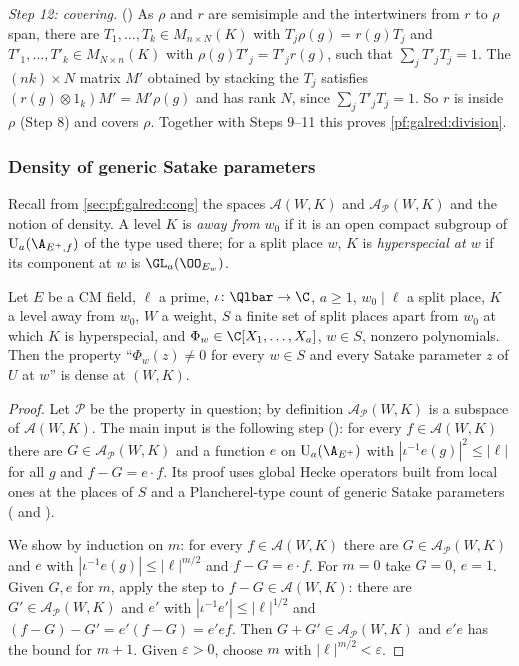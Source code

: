 \emph{Step 12: covering.} () As $\rho$ and $r$ are
semisimple and the intertwiners from $r$ to $\rho$ span, there are $T_1,\dots,T_k\in M_{n\times N}(K)$ with
$T_j\rho(g)=r(g)T_j$ and $T'_1,\dots,T'_k\in M_{N\times n}(K)$ with $\rho(g)T'_j=T'_jr(g)$, such that $\sum_jT'_jT_j=1$. The
$(nk)\times N$ matrix $M'$ obtained by stacking the $T_j$ satisfies $(r(g)\otimes1_k)M'=M'\rho(g)$ and has rank $N$, since
$\sum_jT'_jT_j=1$. So $r$ is inside $\rho$ (Step 8) and covers $\rho$. Together with Steps 9--11 this proves
\cref{pf:galred:division}.

\subsubsection{Density of generic Satake parameters}

Recall from \cref{sec:pf:galred:cong} the spaces $\mathcal A(W,K)$ and $\mathcal A_{\mathcal P}(W,K)$ and the notion of
density. A level $K$ is \emph{away from} $w_0$ if it is an open compact subgroup of $\galredU_a(\A_{E^+,f})$ of the type
used there; for a split place $w$, $K$ is \emph{hyperspecial at $w$} if its component at $w$ is $\GL_a(\OO_{E_w})$.

\begin{theorem}\label{pf:galred:densegen}
Let $E$ be a CM field, $\ell$ a prime, $\iota\colon\Qlbar\to\C$, $a\ge1$, $w_0\mid\ell$ a split place, $K$ a level away
from $w_0$, $W$ a weight, $S$ a finite set of split places apart from $w_0$ at which $K$ is hyperspecial, and $\Phi_w\in
\C[X_1,\dots,X_a]$, $w\in S$, nonzero polynomials. Then the property ``$\Phi_w(z)\ne0$ for every $w\in S$ and every Satake
parameter $z$ of $U$ at $w$'' is dense at $(W,K)$.
\end{theorem}

\begin{proof}
Let $\mathcal P$ be the property in question; by definition $\mathcal A_{\mathcal P}(W,K)$ is a subspace of
$\mathcal A(W,K)$. The main input is the following step
(): for every $f\in\mathcal A(W,K)$ there are $G\in\mathcal A_{\mathcal P}(W,K)$
and a function $e$ on $\galredU_a(\A_{E^+})$ with $|\iota^{-1}e(g)|^2\le|\ell|$ for all $g$ and $f-G=e\cdot f$. Its proof
uses global Hecke operators built from local ones at the places of $S$ and a Plancherel-type count of generic Satake
parameters ( and ).

We show by induction on $m$: for every $f\in\mathcal A(W,K)$ there are $G\in\mathcal A_{\mathcal P}(W,K)$ and $e$ with
$|\iota^{-1}e(g)|\le|\ell|^{m/2}$ and $f-G=e\cdot f$. For $m=0$ take $G=0$, $e=1$. Given $G,e$ for $m$, apply the step to
$f-G\in\mathcal A(W,K)$: there are $G'\in\mathcal A_{\mathcal P}(W,K)$ and $e'$ with $|\iota^{-1}e'|\le|\ell|^{1/2}$
and $(f-G)-G'=e'(f-G)=e'e f$. Then $G+G'\in\mathcal A_{\mathcal P}(W,K)$ and $e'e$ has the bound for $m+1$. Given
$\varepsilon>0$, choose $m$ with $|\ell|^{m/2}<\varepsilon$.
\end{proof}

